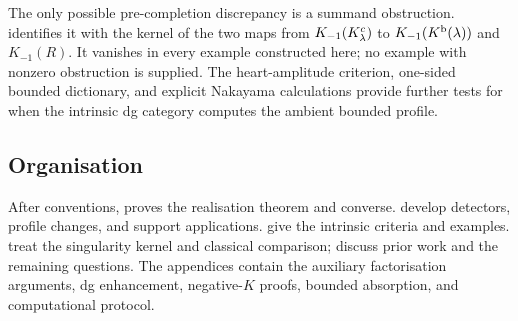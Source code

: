 \documentclass[11pt]{amsart}
\begin{document}
The only possible pre-completion discrepancy is a summand obstruction.  identifies it with the kernel of the two maps from \(K_{-1}(K^c_\lambda)\) to \(K_{-1}(K^{\mathrm b}(\lambda))\) and \(K_{-1}(R)\). It vanishes in every example constructed here; no example with nonzero obstruction is supplied. The heart-amplitude criterion, one-sided bounded dictionary, and explicit Nakayama calculations provide further tests for when the intrinsic dg category computes the ambient bounded profile.

\subsection*{Organisation}
After conventions,  proves the realisation theorem and converse.  develop detectors, profile changes, and support applications.  give the intrinsic criteria and examples.  treat the singularity kernel and classical comparison;  discuss prior work and the remaining questions. The appendices contain the auxiliary factorisation arguments, dg enhancement, negative-\(K\) proofs, bounded absorption, and computational protocol.


















\appendix






\clearpage


\end{document}
